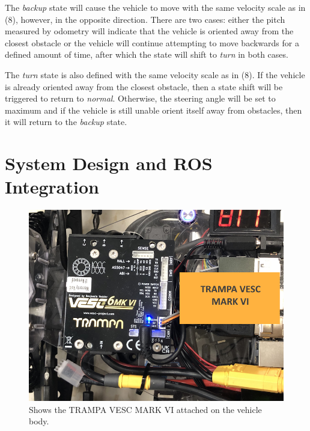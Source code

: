 \documentclass[conference]{IEEEtran}
\begin{document}
The \textit{backup} state will cause the vehicle to move with the same velocity scale as in (8), however, in the opposite direction. There are two cases: either the pitch measured by odometry will indicate that the vehicle is oriented away from the closest obstacle or the vehicle will continue attempting to move backwards for a defined amount of time, after which the state will shift to \textit{turn} in both cases.

The \textit{turn} state is also defined with the same velocity scale as in (8). If the vehicle is already oriented away from the closest obstacle, then a state shift will be triggered to return to \textit{normal}. Otherwise, the steering angle will be set to maximum and if the vehicle is still unable orient itself away from obstacles, then it will return to the \textit{backup} state.

\section{System Design and ROS Integration}

\begin{figure}
    \centering
    \includegraphics[scale=0.15]{motor_ctrl_diagram.png}
    \caption{Shows the TRAMPA VESC MARK VI attached on the vehicle body.}
    \label{Figure 5}
\end{figure}



\end{document}
